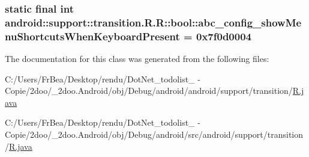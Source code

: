 \hypertarget{classandroid_1_1support_1_1transition_1_1_r_1_1bool_d00c63383a927e7162fb099b8f51c2f0}{
\subsubsection[{abc\_\-config\_\-showMenuShortcutsWhenKeyboardPresent}]{\setlength{\rightskip}{0pt plus 5cm}static final int android::support::transition.R.R::bool::abc\_\-config\_\-showMenuShortcutsWhenKeyboardPresent = 0x7f0d0004}}
\label{classandroid_1_1support_1_1transition_1_1_r_1_1bool_d00c63383a927e7162fb099b8f51c2f0}




The documentation for this class was generated from the following files:\begin{CompactItemize}
\item 
C:/Users/FrBea/Desktop/rendu/DotNet\_\-todolist\_ - Copie/2doo/\_\-2doo.Android/obj/Debug/android/android/support/transition/\hyperlink{android_2support_2transition_2_r_8java}{R.java}\item 
C:/Users/FrBea/Desktop/rendu/DotNet\_\-todolist\_ - Copie/2doo/\_\-2doo.Android/obj/Debug/android/src/android/support/transition/\hyperlink{src_2android_2support_2transition_2_r_8java}{R.java}\end{CompactItemize}
